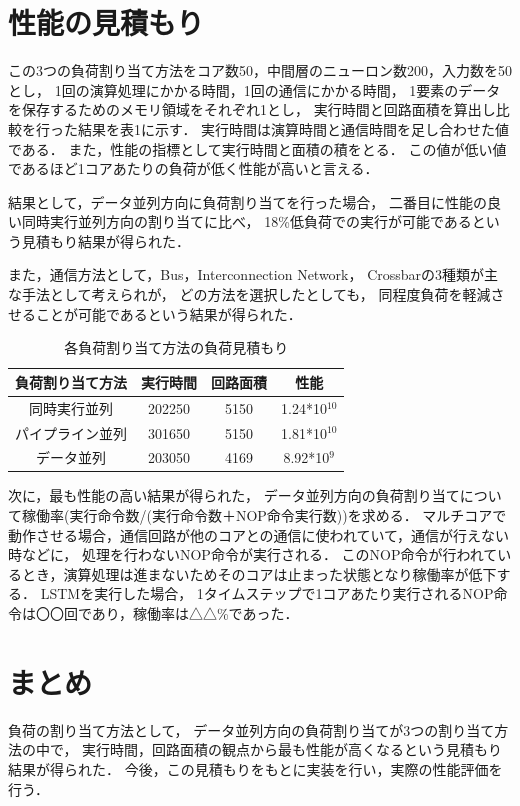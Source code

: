 \documentclass[a4j]{jarticle}
\begin{document}
\begin{Abstract}
 \section{性能の見積もり}
 この3つの負荷割り当て方法をコア数50，中間層のニューロン数200，入力数を50とし，
 1回の演算処理にかかる時間，1回の通信にかかる時間，
 1要素のデータを保存するためのメモリ領域をそれぞれ1とし，
 実行時間と回路面積を算出し比較を行った結果を表1に示す．
 実行時間は演算時間と通信時間を足し合わせた値である．
 また，性能の指標として実行時間と面積の積をとる．
 この値が低い値であるほど1コアあたりの負荷が低く性能が高いと言える．

 結果として，データ並列方向に負荷割り当てを行った場合，
 二番目に性能の良い同時実行並列方向の割り当てに比べ，
 18\%低負荷での実行が可能であるという見積もり結果が得られた．

 また，通信方法として，Bus，Interconnection Network，
 Crossbarの3種類が主な手法として考えられが，
 どの方法を選択したとしても，
 同程度負荷を軽減させることが可能であるという結果が得られた．

 \begin{table}[htb]
    \begin{center}
      \caption{各負荷割り当て方法の負荷見積もり}
      \begin{tabular}{|c||c|c|c|}\hline
       負荷割り当て方法 & 実行時間 & 回路面積 & 性能 \\ \hline
       同時実行並列 & 202250 & 5150 & 1.24*10$^{10}$ \\ \hline
       パイプライン並列 & 301650 & 5150 & 1.81*10$^{10}$ \\ \hline
       データ並列 & 203050 &  4169 & 8.92*10$^{9}$ \\ \hline
     \end{tabular}
   \end{center}
 \end{table}


次に，最も性能の高い結果が得られた，
データ並列方向の負荷割り当てについて稼働率(実行命令数/(実行命令数＋NOP命令実行数))を求める．
マルチコアで動作させる場合，通信回路が他のコアとの通信に使われていて，通信が行えない時などに，
処理を行わないNOP命令が実行される．
このNOP命令が行われているとき，演算処理は進まないためそのコアは止まった状態となり稼働率が低下する．
LSTMを実行した場合，
1タイムステップで1コアあたり実行されるNOP命令は〇〇回であり，稼働率は△△\%であった．

 \section{まとめ}
負荷の割り当て方法として，
データ並列方向の負荷割り当てが3つの割り当て方法の中で，
実行時間，回路面積の観点から最も性能が高くなるという見積もり結果が得られた．
今後，この見積もりをもとに実装を行い，実際の性能評価を行う．



\end{Abstract}
\end{document}

